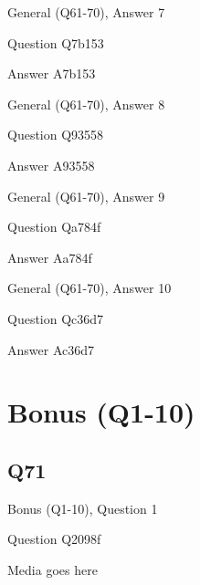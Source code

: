 \documentclass[11pt]{beamer}
\begin{document}
\begin{frame}[t]{General (Q61-70), Answer 7}
\vspace{2em}
\begin{block}{Question}
Q7b153
\end{block}
\pause{}
\begin{block}{Answer}
A7b153
\end{block}
\end{frame}
    

\begin{frame}[t]{General (Q61-70), Answer 8}
\vspace{2em}
\begin{block}{Question}
Q93558
\end{block}
\pause{}
\begin{block}{Answer}
A93558
\end{block}
\end{frame}
    

\begin{frame}[t]{General (Q61-70), Answer 9}
\vspace{2em}
\begin{block}{Question}
Qa784f
\end{block}
\pause{}
\begin{block}{Answer}
Aa784f
\end{block}
\end{frame}
    

\begin{frame}[t]{General (Q61-70), Answer 10}
\vspace{2em}
\begin{block}{Question}
Qc36d7
\end{block}
\pause{}
\begin{block}{Answer}
Ac36d7
\end{block}
\end{frame}
    

\section{Bonus (Q1-10)}
    

\subsection*{Q71}
\begin{frame}[t]{Bonus (Q1-10), Question 1}
\vspace{2em}
\begin{block}{Question}
Q2098f
\end{block}
\begin{center}
Media goes here
\end{center}
\end{frame}
    
\end{document}
